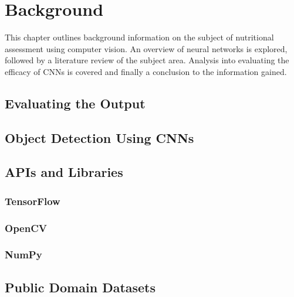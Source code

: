 \chapter{Background}
\label{background}

This chapter outlines background information on the subject of nutritional assessment using computer vision.
An overview of neural networks is explored, followed by a literature review of the subject area.
Analysis into evaluating the efficacy of CNNs is covered and finally a conclusion to the information gained.











\section{Evaluating the Output}




\section{Object Detection Using CNNs}


\section{APIs and Libraries}
\tocless\subsection{TensorFlow}


\tocless\subsection{OpenCV}


\tocless\subsection{NumPy}


\section{Public Domain Datasets}


